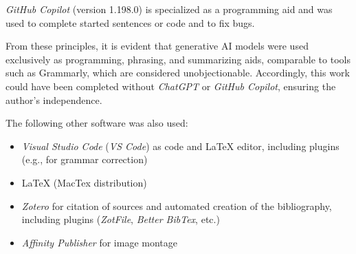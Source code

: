 \noindent \textit{GitHub Copilot} (version 1.198.0) is specialized as a programming aid and was
used to complete started sentences or code and to fix bugs.

From these principles, it is evident that generative AI models were used
exclusively as programming, phrasing, and summarizing aids, comparable to tools
such as Grammarly, which are considered unobjectionable. Accordingly, this work
could have been completed without \textit{ChatGPT} or \textit{GitHub Copilot}, ensuring the
author’s independence.

\noindent The following other software was also used:
\begin{itemize}
    \item \textit{Visual Studio Code} (\textit{VS Code}) as code and LaTeX editor, including plugins (e.g., for grammar correction)
    \item LaTeX (MacTex distribution)
    \item \textit{Zotero} for citation of sources and automated creation of the
          bibliography, including plugins (\textit{ZotFile}, \textit{Better BibTex}, etc.)
    \item \textit{Affinity Publisher} for image montage
\end{itemize}




